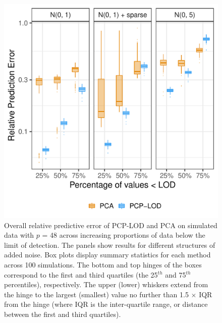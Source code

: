 {\begin{figure}
    \centering
\includegraphics[width=.85\textwidth]{figures/sim_boxplots_48.pdf}
   \caption{Overall relative predictive error of PCP-LOD and PCA on simulated data with $p$ = 48 across increasing proportions of data below the limit of detection. The panels show results for different structures of added noise. Box plots display summary statistics for each method across 100 simulations. The bottom and top hinges of the boxes correspond to the first and third quartiles (the 25$^{th}$ and 75$^{th}$ percentiles), respectively. The upper (lower) whiskers extend from the hinge to the largest (smallest) value no further than 1.5 $\times$ IQR from the hinge (where IQR is the inter-quartile range, or distance between the first and third quartiles).}
    \label{fig:overall_48}
\end{figure}


}
